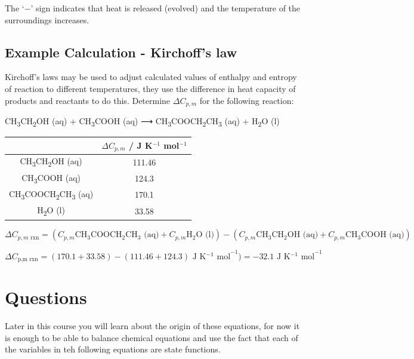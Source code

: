 \documentclass[
]{book}
\begin{document}
The `−' sign indicates that heat is released (evolved) and the temperature of the surroundings increases.

\hypertarget{subsec:examplekirchoff}{%
\subsection{Example Calculation - Kirchoff's law}\label{subsec:examplekirchoff}}

Kirchoff's laws may be used to adjust calculated values of enthalpy and entropy of reaction to different temperatures, they use the difference in heat capacity of products and reactants to do this. Determine \(ΔC_{p,m}\) for the following reaction:

CH\textsubscript{3}CH\textsubscript{2}OH (aq) + CH\textsubscript{3}COOH (aq) ⟶ CH\textsubscript{3}COOCH\textsubscript{2}CH\textsubscript{3} (aq) + H\textsubscript{2}O (l)

\begin{longtable}[]{@{}cc@{}}
\toprule
& \(ΔC_{p,m}\) / J K\(^{−1}\) mol\(^{−1}\)\tabularnewline
\midrule
\endhead
CH\textsubscript{3}CH\textsubscript{2}OH (aq) & 111.46\tabularnewline
CH\textsubscript{3}COOH (aq) & 124.3\tabularnewline
CH\textsubscript{3}COOCH\textsubscript{2}CH\textsubscript{3} (aq) & 170.1\tabularnewline
H\textsubscript{2}O (l) & 33.58\tabularnewline
\bottomrule
\end{longtable}

\begin{equation*}
ΔC_{p,m \textrm{ rxn}} = (C_{p,m} \textrm{CH$_3$COOCH$_2$CH$_3$ (aq)} + C_{p,m} \textrm{H$_2$O (l)}) − (C_{p,m} \textrm{CH$_3$CH$_2$OH (aq)} + C_{p,m} \textrm{CH$_3$COOH (aq)})
\end{equation*}

\begin{equation*}
ΔC_\textrm{p,m rxn} = (170.1 + 33.58) − (111.46 + 124.3) \textrm{ J K$^{-1}$ mol}^{−1}) = − 32.1 \textrm{ J K$^{-1}$ mol}^{−1}
\end{equation*}

\hypertarget{sec:Questions1}{%
\section{Questions}\label{sec:Questions1}}

Later in this course you will learn about the origin of these equations, for now it is enough to be able to balance chemical equations and use the fact that each of the variables in teh following equations are state functions.
\end{document}
